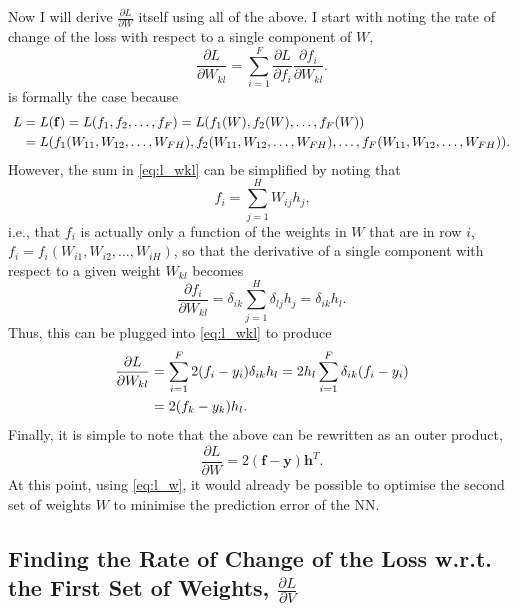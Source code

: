 \documentclass{article}
\begin{document}
Now I will derive $\frac{\partial L}{\partial W}$ itself using all of the above. I start with noting the rate of change of the loss with respect to a single component of $W$,
\begin{equation}
\label{eq:l_wkl}
    \phantom{.}\frac{\partial L}{\partial W_{kl}} = \displaystyle\sum_{i=1}^F \frac{\partial L}{\partial f_i}\frac{\partial f_i}{\partial W_{kl}}.
\end{equation}
 is formally the case because
\begin{align}
    \phantom{.}L &= L(\mathbf{f}) = L(f_1, f_2,\ldots,f_F) = L(f_1(W),f_2(W),\ldots,f_F(W))\notag \\ &= L(f_1(W_{11},W_{12},\ldots,W_{FH}),f_2(W_{11},W_{12},\ldots,W_{FH}),\ldots,f_F(W_{11},W_{12},\ldots,W_{FH})).
\end{align}
However, the sum in \cref{eq:l_wkl} can be simplified by noting that
\begin{equation}
    \phantom{,}f_i = \displaystyle\sum_{j=1}^H W_{ij}h_j,
\end{equation}
i.e., that $f_i$ is actually only a function of the weights in $W$ that are in row $i$, $f_i = f_i(W_{i1},W_{i2},\ldots,W_{iH})$, so that the derivative of a single component with respect to a given weight $W_{kl}$ becomes
\begin{equation}
    \phantom{.}\frac{\partial f_i}{\partial W_{kl}} = \delta_{ik}\displaystyle\sum_{j=1}^H \delta_{lj}h_j = \delta_{ik}h_l.
\end{equation}
Thus, this can be plugged into \cref{eq:l_wkl} to produce
\begin{align}
    \phantom{.}\frac{\partial L}{\partial W_{kl}} &= \displaystyle\sum_{i=1}^F 2(f_i - y_i)\delta_{ik}h_l = 2h_l\displaystyle\sum_{i=1}^F\delta_{ik}(f_i - y_i\notag) \\ &= 2(f_k - y_k)h_l.
\end{align}
Finally, it is simple to note that the above can be rewritten as an outer product,
\begin{equation}
    \label{eq:l_w}
    \phantom{.}\frac{\partial L}{\partial W} = 2(\mathbf{f} - \mathbf{y})\mathbf{h}^T.
\end{equation}
At this point, using \cref{eq:l_w}, it would already be possible to optimise the second set of weights $W$ to minimise the prediction error of the NN.

\subsection{Finding the Rate of Change of the Loss w.r.t. the First Set of Weights, \texorpdfstring{$\frac{\partial L}{\partial V}$}{dL/dV}}
\end{document}
